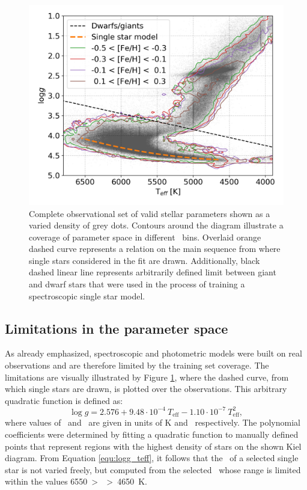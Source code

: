 \begin{figure}
	\centering
	\includegraphics[width=\columnwidth]{kiel_cannon_contour_iDR3.png}
	\caption{Complete observational set of valid stellar parameters shown as a varied density of grey dots. Contours around the diagram illustrate a coverage of parameter space in different \Feh\ bins. Overlaid orange dashed curve represents a relation on the main sequence from where single stars considered in the fit are drawn. Additionally, black dashed linear line represents arbitrarily defined limit between giant and dwarf stars that were used in the process of training a spectroscopic single star model.}
	\label{fig:kiel_cannon}
\end{figure}

\subsection{Limitations in the parameter space}
As already emphasized, spectroscopic and photometric models were built on real observations and are therefore limited by the training set coverage. The limitations are visually illustrated by Figure \ref{fig:kiel_cannon}, where the dashed curve, from which single stars are drawn, is plotted over the observations. This arbitrary quadratic function is defined as:
\begin{equation}
	\label{equ:logg_teff}
	\log g = 2.576 + 9.48 \cdot 10^{-4} \ T_\mathrm{eff} - 1.10 \cdot 10^{-7} \ T_\mathrm{eff}^2,
\end{equation}
where values of \Teff\ and \Logg\ are given in units of K and \cms\ respectively. The polynomial coefficients were determined by fitting a quadratic function to manually defined points that represent regions with the highest density of stars on the shown Kiel diagram. From Equation \ref{equ:logg_teff}, it follows that the \Logg\ of a selected single star is not varied freely, but computed from the selected \Teff\ whose range is limited within the values 6550~\textgreater~\Teff~\textgreater~4650~K.

